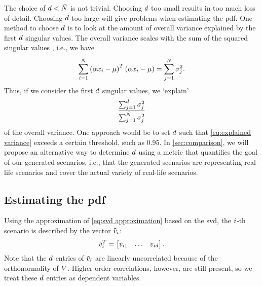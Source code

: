 The choice of $d < \bar{N}$ is not trivial.
Choosing $d$ too small results in too much loss of detail.
Choosing $d$ too large will give problems when estimating the \ac{pdf}.
One method to choose $d$ is to look at the amount of overall variance explained by the first $d$ singular values.
The overall variance scales with the sum of the squared singular values \autocite[p.~77]{golub2013matrix}, i.e., we have
\begin{equation}
	\sum_{i=1}^{N} \left( \alpha x_{i}-\mu \right)^T \left( \alpha x_{i}-\mu \right) 
	= \sum_{j=1}^{\bar{N}} \sigma_{j}^2.
\end{equation}
Thus, if we consider the first $d$ singular values, we `explain' 
\begin{equation}
	\label{eq:explained variance}
	\frac{\sum_{j=1}^{d} \sigma_{j}^2}{\sum_{j=1}^{\bar{N}} \sigma_{j}^2}
\end{equation}
of the overall variance.
One approach would be to set $d$ such that \cref{eq:explained variance} exceeds a certain threshold, such as 0.95.
In \cref{sec:comparison}, we will propose an alternative way to determine $d$ using a metric that quantifies the goal of our generated scenarios, i.e., that the generated scenarios are representing real-life scenarios and cover the actual variety of real-life scenarios.



\subsection{Estimating the \acl{pdf}}
\label{sec:kde}

Using the approximation of \cref{eq:svd approximation} based on the \ac{svd}, the $i$-th scenario is described by the vector $\tilde{v}_{i}$:
\begin{equation}
	\tilde{v}_{i}^T = \begin{bmatrix}
		v_{i 1} & \ldots & v_{i d}
	\end{bmatrix}.
\end{equation}
Note that the $d$ entries of $\tilde{v}_{i}$ are linearly uncorrelated because of the orthonormality of $V$.
Higher-order correlations, however, are still present, so we treat these $d$ entries as dependent variables.

